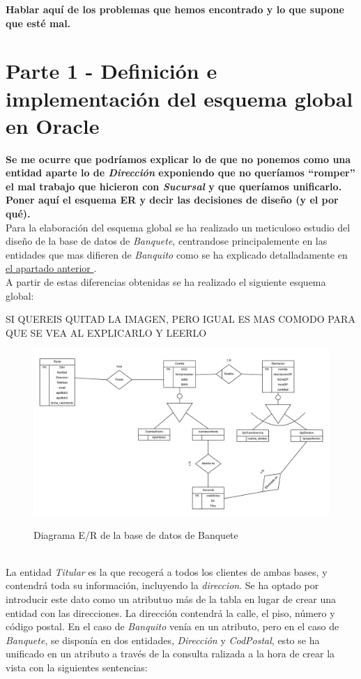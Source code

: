 \documentclass{article}
\begin{document}
\textbf{Hablar aquí de los problemas que hemos encontrado y lo que supone que esté mal.}

\section{Parte 1 - Definición e implementación del esquema global en Oracle}

\textbf{Se me ocurre que podríamos explicar lo de que no ponemos como una entidad aparte lo de \emph{Dirección} exponiendo que no queríamos ``romper'' el mal trabajo que hicieron con \emph{Sucursal} y que queríamos unificarlo.}
\textbf{Poner aquí el esquema ER y decir las decisiones de diseño (y el por qué).}\\

Para la elaboración del esquema global se ha realizado un meticuloso estudio del diseño de la base de datos de \emph{Banquete}, centrandose principalemente en las entidades que mas difieren de \emph{Banquito} como se ha explicado detalladamente en \hyperref[mejoras]{el apartado anterior }.\\
A partir de estas diferencias obtenidas se ha realizado el siguiente esquema global:\\
\begin{huge}
SI QUEREIS QUITAD LA IMAGEN, PERO IGUAL ES MAS COMODO PARA QUE SE VEA AL EXPLICARLO Y LEERLO\\
\end{huge}
\begin{figure}
\centering
\includegraphics[scale=0.55]{images/DiagramaGLOBAL.png}
\label{fig:er_banquete}
\caption{Diagrama E/R de la base de datos de Banquete}
\end{figure}\\

La entidad \emph{Titular} es la que recogerá a todos los clientes de ambas bases, y contendrá toda su información, incluyendo la \textit{direccion}. Se ha optado por introducir este dato como un atributuo más de la tabla en lugar de crear una entidad con las direcciones. La dirección contendrá la calle, el piso, número y código postal. En el caso de \emph{Banquito} venía en un atributo, pero en el caso de \emph{Banquete}, se disponía en dos entidades, \textit{Dirección} y \textit{CodPostal}, esto se ha unificado en un atributo a través de la consulta ralizada a la hora de crear la vista con la siguientes sentencias:
\end{document}
